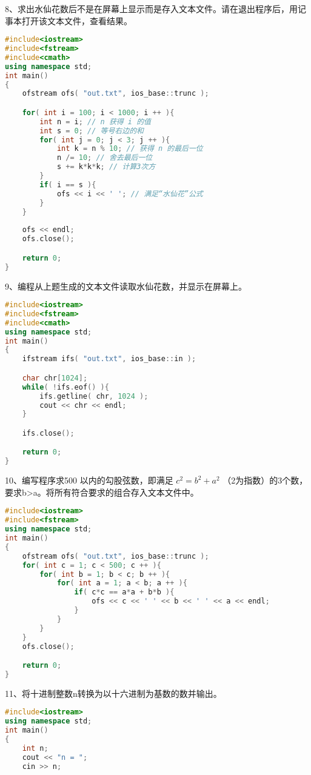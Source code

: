 \documentclass[14pt,aps,prb]{revtex4}
\begin{document}
\begin{spacing}{1.5}
8、求出水仙花数后不是在屏幕上显示而是存入文本文件。请在退出程序后，用记事本打开该文本文件，查看结果。
\begin{lstlisting}[language=C++]
#include<iostream>
#include<fstream>
#include<cmath>
using namespace std;
int main()
{
    ofstream ofs( "out.txt", ios_base::trunc );

    for( int i = 100; i < 1000; i ++ ){
        int n = i; // n 获得 i 的值
        int s = 0; // 等号右边的和
        for( int j = 0; j < 3; j ++ ){
            int k = n % 10; // 获得 n 的最后一位
            n /= 10; // 舍去最后一位
            s += k*k*k; // 计算3次方
        }
        if( i == s ){
            ofs << i << ' '; // 满足“水仙花”公式
        }
    }
    
    ofs << endl;
    ofs.close();

    return 0;
}
\end{lstlisting}

9、编程从上题生成的文本文件读取水仙花数，并显示在屏幕上。
\begin{lstlisting}[language=C++]
#include<iostream>
#include<fstream>
#include<cmath>
using namespace std;
int main()
{
    ifstream ifs( "out.txt", ios_base::in );

    char chr[1024];
    while( !ifs.eof() ){
        ifs.getline( chr, 1024 );
        cout << chr << endl;
    }

    ifs.close();

    return 0;
}
\end{lstlisting}

10、编写程序求500 以内的勾股弦数，即满足 $c^2=b^2+a^2$ （2为指数）的3个数，要求b>a。将所有符合要求的组合存入文本文件中。
\begin{lstlisting}[language=C++]
#include<iostream>
#include<fstream>
using namespace std;
int main()
{
    ofstream ofs( "out.txt", ios_base::trunc );
    for( int c = 1; c < 500; c ++ ){
        for( int b = 1; b < c; b ++ ){
            for( int a = 1; a < b; a ++ ){
                if( c*c == a*a + b*b ){
                    ofs << c << ' ' << b << ' ' << a << endl;
                }
            }
        }
    }
    ofs.close();

    return 0;
}
\end{lstlisting}

11、将十进制整数n转换为以十六进制为基数的数并输出。
\begin{lstlisting}[language=C++]
#include<iostream>
using namespace std;
int main()
{
    int n;
    cout << "n = ";
    cin >> n;


\end{lstlisting}
\end{spacing}
\end{document}
